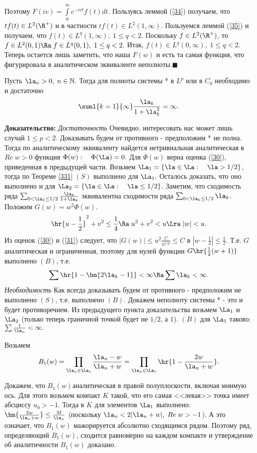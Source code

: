 \documentclass[a4paper]{article}
\begin{document}
Поэтому $F(iv)=\int\limits_0^{\infty}e^{-ivt}f(t)dt$. Пользуясь
леммой (\ref{34}) получаем, что $tf(t)\in L^2(\R ^{+})$ и в
частности $tf(t)\in L^2(1,\infty).$ Пользуемся леммой (\ref{35}) и
получаем, что $f(t)\in L^q(1,\infty),\;1\le q<2$. Поскольку $f\in
L^2(\R ^{+})$, то $f\in L^2(0,1)\Ra \;f\in
L^q(0,1),\;1\le q<2.$ Итак, $f(t)\in L^q(0,\infty),\;1\le q<2.$
Теперь остается лишь заметить, что наша $F(w)$ и есть та самая
функция, что фигурировала в аналитическом эквиваленте
неполноты.$\blacksquare$

\begin{theorems}
Пусть $\la_n>0,\;n\in\mathbb{N}.$ Тогда для полноты системы *
в $L^p$ или в $C_0$ необходимо и достаточно
$$\suml{k=1}{\infty}\frac{\la_k}{1+\la_k^2}=\infty.$$
\end{theorems}
\textbf{Доказательство:} \emph{Достаточность} Очевидно,
интересовать нас может лишь случай $1\le p<2.$ Доказывать будем
от противного - предположим * не полна. Тогда по аналитическому
эквиваленту найдется нетривиальная аналитическая в $Re\;w>0$
функция $\Phi(w):\quad\Phi(\La)=0.$ Для $\Phi(w)$ верна оценка
(\ref{30}), приведенная в предыдущей части. Возьмем
$\La_1=\{\la\in\La:\quad\la>1/2\}$, тогда по
Теореме \ref{331} $(S)$ выполнено для $\La_1.$ Осталось
доказать, что оно выполнено и для
$\La_2=\{\la\in\La:\quad\la\le1/2\}$. Заметим,
что сходимость ряда
$\sum_{0<\la_k\le1/2}\frac{\la_k}{1+\la_k}$
эквивалентна сходимости ряда $\sum_{0<\la_k\le1/2}\la_k.$
Положим $G(w)=w^2\Phi(w)$.
\begin{equation}\label{31}
\hr{u-\frac12}^2+v^2\le\frac14\Ra\;u^2+v^2<u\Lra\;|w|<u.
\end{equation}
Из оценок (\ref{30}) и (\ref{31}) следует, что $|G(w)|\le
u^2\frac{C}{u^{1/p}}\le C$ в $|w-\frac12|\le\frac12.$ Т.е. $G$\т аналитическая и ограниченная, поэтому для нулей функции
$G\hr{\frac12(w+1)}$ выполнено $(B)$, т.е.
$$\sum\hr{1-\hm{2\la_k-1}}<\infty\Ra\sum\la_k<\infty.$$
\emph{Необходимость} Как всегда доказывать будем от противного -
предположим не выполнено $(S)$, т.е. выполнено $(B)$. Докажем
неполноту системы * - это и будет противоречием. Из предыдущего
пункта доказательства возьмем $\La_1$ и $\La_2$ (только
теперь граничной точкой будет не $1/2$, а $1$). $(B)$ для
$\La_1$ таково: $\sum\frac1{\la_n}<\infty.$

Возьмем
$$B_1(w)=\prod\limits_{\la_n\in\La_1}\frac{\la_n-w}{\la_n+w}=\prod\limits_{\la_n\in\La_1}\hr{1-\frac{2w}{\la_n+w}}.$$

Докажем, что $B_1(w)$\т аналитическая в правой полуплоскости,
включая мнимую ось. Для этого возьмем компакт $K$ такой, что его
самая <<левая>> точка имеет абсциссу $u_0>-1.$ Тогда в $K$ для
элементов $\La_1$ выполнено:
$\hm{\frac{2w}{\la_n+w}}\le\frac{M}{\la_n}$
(поскольку $\la_n<2|\la_n+w|,\;Re\;w>-1$). А это означает,
что $B_1(w)$ мажорируется абсолютно сходящимся рядом. Поэтому ряд,
определяющий $B_1(w)$, сходится равномерно на каждом компакте и
утверждение об аналитичности $B_1(w)$ доказано.
\end{document}
